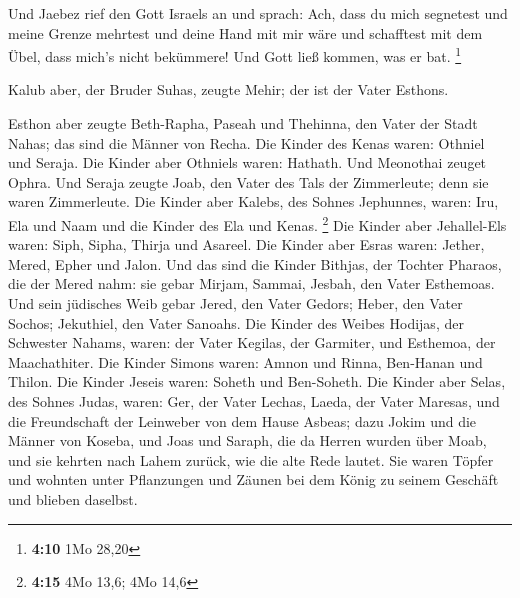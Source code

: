  Und Jaebez rief den Gott Israels an und sprach: Ach,
dass du mich segnetest und meine Grenze mehrtest und deine Hand mit mir
wäre und schafftest mit dem Übel, dass mich's nicht bekümmere! Und Gott
ließ kommen, was er bat. \footnote{\textbf{4:10} 1Mo 28,20}

 Kalub aber, der Bruder Suhas, zeugte Mehir; der ist der
Vater Esthons.

 Esthon aber zeugte Beth-Rapha, Paseah und Thehinna, den
Vater der Stadt Nahas; das sind die Männer von Recha. 
Die Kinder des Kenas waren: Othniel und Seraja. Die Kinder aber Othniels
waren: Hathath.  Und Meonothai zeuget Ophra. Und Seraja
zeugte Joab, den Vater des Tals der Zimmerleute; denn sie waren
Zimmerleute.  Die Kinder aber Kalebs, des Sohnes
Jephunnes, waren: Iru, Ela und Naam und die Kinder des Ela und Kenas.
\footnote{\textbf{4:15} 4Mo 13,6; 4Mo 14,6}  Die Kinder
aber Jehallel-Els waren: Siph, Sipha, Thirja und Asareel.
 Die Kinder aber Esras waren: Jether, Mered, Epher und
Jalon. Und das sind die Kinder Bithjas, der Tochter Pharaos, die der
Mered nahm: sie gebar Mirjam, Sammai, Jesbah, den Vater Esthemoas.
 Und sein jüdisches Weib gebar Jered, den Vater Gedors;
Heber, den Vater Sochos; Jekuthiel, den Vater Sanoahs. 
Die Kinder des Weibes Hodijas, der Schwester Nahams, waren: der Vater
Kegilas, der Garmiter, und Esthemoa, der Maachathiter. 
Die Kinder Simons waren: Amnon und Rinna, Ben-Hanan und Thilon. Die
Kinder Jeseis waren: Soheth und Ben-Soheth.  Die Kinder
aber Selas, des Sohnes Judas, waren: Ger, der Vater Lechas, Laeda, der
Vater Maresas, und die Freundschaft der Leinweber von dem Hause Asbeas;
 dazu Jokim und die Männer von Koseba, und Joas und
Saraph, die da Herren wurden über Moab, und sie kehrten nach Lahem
zurück, wie die alte Rede lautet.  Sie waren Töpfer und
wohnten unter Pflanzungen und Zäunen bei dem König zu seinem Geschäft
und blieben daselbst.

